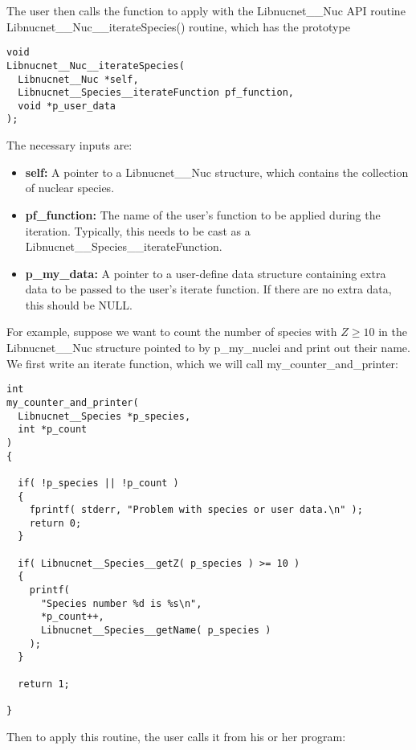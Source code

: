 \documentclass{article}    %
\begin{document}
The user then calls the function to apply with the Libnucnet\_\_Nuc API
routine Libnucnet\_\_Nuc\_\_iterateSpecies() routine, which has the prototype

\begin{verbatim}
void
Libnucnet__Nuc__iterateSpecies(
  Libnucnet__Nuc *self,
  Libnucnet__Species__iterateFunction pf_function,
  void *p_user_data
);
\end{verbatim}

\noindent The necessary inputs are:

\begin{itemize}

\item {\bf self:} A pointer to a Libnucnet\_\_Nuc structure, which contains
the collection of nuclear species.

\item {\bf pf\_function:} The name of the user's function to be applied
during the iteration.
Typically, this needs to be cast as a
Libnucnet\_\_Species\_\_iterateFunction.

\item {\bf p\_my\_data:}  A pointer to a user-define data structure containing
extra data to be passed to the user's iterate function.  If there are
no extra data, this should be NULL.

\end{itemize}

For example, suppose we want to count the number of species with
$Z \geq 10$ in the
Libnucnet\_\_Nuc structure pointed to by p\_my\_nuclei and print out
their name.  We first write an iterate function, which we will
call my\_counter\_and\_printer:

\begin{verbatim}
int
my_counter_and_printer(
  Libnucnet__Species *p_species,
  int *p_count
)
{

  if( !p_species || !p_count ) 
  {
    fprintf( stderr, "Problem with species or user data.\n" );
    return 0;
  }

  if( Libnucnet__Species__getZ( p_species ) >= 10 )
  {
    printf(
      "Species number %d is %s\n",
      *p_count++,
      Libnucnet__Species__getName( p_species )
    );
  }

  return 1;

} 

\end{verbatim}

\noindent Then to apply this routine, the user calls it from his or her program:
\end{document}
